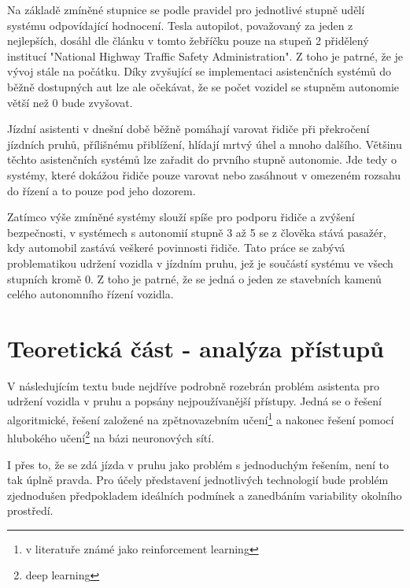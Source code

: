 \documentclass[czech, bc, kky, he, iso690numb]{fasthesis}
\begin{document}
       	Na základě zmíněné stupnice se podle pravidel pro jednotlivé stupně udělí systému odpovídající hodnocení. Tesla autopilot, považovaný za jeden z nejlepších, dosáhl dle článku \cite{autopilot} v tomto žebříčku pouze na stupeň 2 přidělený institucí "National Highway Traffic Safety Administration". Z toho je patrné, že je vývoj stále na počátku. Díky zvyšující se implementaci asistenčních systémů do běžně dostupných aut lze ale očekávat, že se počet vozidel se stupněm autonomie větší než 0 bude zvyšovat.         
        
        Jízdní asistenti v dnešní době běžně pomáhají varovat řidiče při překročení jízdních pruhů, přílišnému přiblížení, hlídají mrtvý úhel a mnoho dalšího. Většinu těchto asistenčních systémů lze zařadit do prvního stupně autonomie. Jde tedy o systémy, které dokážou řidiče pouze varovat nebo zasáhnout v omezeném rozsahu do řízení a to pouze pod jeho dozorem.
        
        Zatímco výše zmíněné systémy slouží spíše pro podporu řidiče a zvýšení bezpečnosti, v systémech s autonomií stupně 3 až 5 se z člověka stává pasažér, kdy automobil zastává veškeré povinnosti řidiče. Tato práce se zabývá problematikou udržení vozidla v jízdním pruhu, jež je součástí systému ve všech stupních kromě 0. Z toho je patrné, že se jedná o jeden ze stavebních kamenů celého autonomního řízení vozidla.
        
    \chapter{Teoretická část - analýza přístupů}\label{chap:01_asisten_jizdy_v_pruhu}
	    V následujícím textu bude nejdříve podrobně rozebrán problém asistenta pro udržení vozidla v pruhu a popsány nejpoužívanější přístupy. Jedná se o řešení algoritmické, řešení založené na zpětnovazebním učení\footnote{v literatuře známé jako reinforcement learning} a nakonec řešení pomocí hlubokého učení\footnote{deep learning} na bázi neuronových sítí.
	    
        I přes to, že se zdá jízda v pruhu jako problém s jednoduchým řešením, není to tak úplně pravda. Pro účely představení jednotlivých technologií bude problém zjednodušen předpokladem ideálních podmínek a zanedbáním variability okolního prostředí.
        
\end{document}
